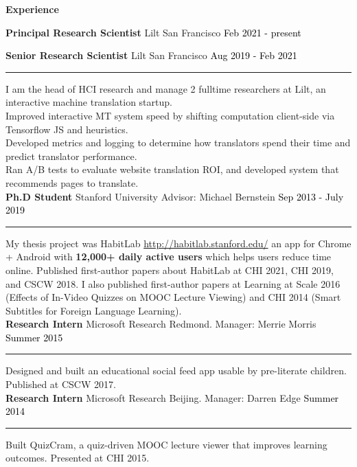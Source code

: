 \documentclass[10pt,A4]{article}
\newcommand{\cvsection}[1]
{
	\begin{center}
		\large\textcolor{sectcol}{\textbf{#1}}
	\end{center}
}
\newcommand{\cvevtzero}[4]
{

	\textbf{#2} \hspace{1mm} \textcolor{bgcol}{#3} \hfill \vspace{2.5pt}\textcolor{black}{#1}

\vspace{-8pt}
\textcolor{softcol}{\hrule}
\vspace{6pt}

}
\newcommand{\cvevtzeronohrule}[4]
{

  \textbf{#2} \hspace{1mm} \textcolor{bgcol}{#3} \hfill \vspace{2.5pt}\textcolor{black}{#1}

\vspace{-8pt}
\vspace{6pt}

}
\newcommand{\cvevtone}[4]
{

	\textbf{#2} \hspace{1mm} \textcolor{bgcol}{#3} \hfill \vspace{2.5pt}\textcolor{black}{#1}

\vspace{-8pt}
\textcolor{softcol}{\hrule}
\vspace{6pt}

  #4\\[3pt]

}
\begin{document}
\cvsection{Experience}

\cvevtzeronohrule{Feb 2021 - present}{Principal Research Scientist}{\textcolor{sectcol}{Lilt} \hspace{1mm} San Francisco}\\
\cvevtzero{Aug 2019 - Feb 2021}{Senior Research Scientist}{\hspace{3.2mm} \textcolor{sectcol}{Lilt} \hspace{1mm} San Francisco}\\
I am the head of HCI research and manage 2 fulltime researchers at Lilt, an interactive machine translation startup.\\
Improved interactive MT system speed by shifting computation client-side via Tensorflow JS and heuristics.\\
Developed metrics and logging to determine how translators spend their time and predict translator performance.\\
Ran A/B tests to evaluate website translation ROI, and developed system that recommends pages to translate. \\

\cvevtzero{Sep 2013 - July 2019}{Ph.D Student}{\textcolor{sectcol}{Stanford University} \hspace{1mm} Advisor: Michael Bernstein}\\
My thesis project was HabitLab \url{http://habitlab.stanford.edu/} an app for Chrome + Android with \textbf{12,000+ daily active users} which helps users reduce time online. Published first-author papers about HabitLab at CHI 2021, CHI 2019, and CSCW 2018. I also published first-author papers at Learning at Scale 2016 (Effects of In-Video Quizzes on MOOC Lecture Viewing) and CHI 2014 (Smart Subtitles for Foreign Language Learning).\\ %

%
\cvevtone{Summer 2015}{Research Intern}{\textcolor{sectcol}{Microsoft Research} \hspace{1mm} Redmond. Manager: Merrie Morris}{Designed and built an educational social feed app usable by pre-literate children. Published at CSCW 2017.}

\cvevtone{Summer 2014}{Research Intern}{\textcolor{sectcol}{Microsoft Research} \hspace{1mm} Beijing. Manager: Darren Edge}{Built QuizCram, a quiz-driven MOOC lecture viewer that improves learning outcomes. Presented at CHI 2015.}
\end{document}
